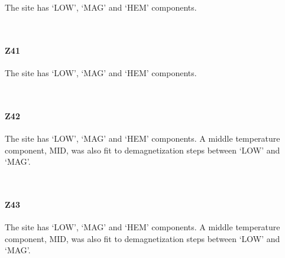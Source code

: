 \documentclass[11pt]{article}
\begin{document}
    The site has `LOW', `MAG' and `HEM' components.



    \begin{center}
    \end{center}
    { \hspace*{\fill} \\}
    
    \newpage
    
    \paragraph{Z41}\label{z41}

The site has `LOW', `MAG' and `HEM' components.



    \begin{center}
    \end{center}
    { \hspace*{\fill} \\}
    
    \newpage
    
    \paragraph{Z42}\label{z42}

    The site has `LOW', `MAG' and `HEM' components. A middle temperature
component, MID, was also fit to demagnetization steps between `LOW' and
`MAG'.



    \begin{center}
    \end{center}
    { \hspace*{\fill} \\}
    
    \newpage
    
    \paragraph{Z43}\label{z43}

    The site has `LOW', `MAG' and `HEM' components. A middle temperature
component, MID, was also fit to demagnetization steps between `LOW' and
`MAG'.
\end{document}
